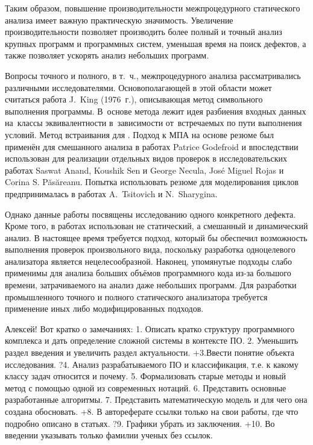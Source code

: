 
Таким образом, повышение производительности межпроцедурного статического анализа имеет важную практическую значимость. Увеличение производительности позволяет производить более полный и точный анализ крупных программ и программных систем, уменьшая время на поиск дефектов, а также позволяет ускорять анализ небольших программ.

Вопросы точного и полного, в т.~ч., межпроцедурного анализа рассматривались различными исследователями. Основополагающей в этой области может считаться работа J.~King (1976~г.), описывающая метод символьного выполнения программы. В~основе метода лежит идея разбиения входных данных на~классы эквивалентности в~зависимости от~встречаемых по пути выполнения условий. Метод встраивания для  . Подход к МПА на основе резюме был применён для смешанного анализа в работах Patrice Godefroid и впоследствии использован для реализации отдельных видов проверок в исследовательских работах Saswat Anand, Koushik Sen и George Necula, Jos\'{e} Miguel Rojas и Corina S. P\u{a}s\u{a}reanu. Попытка использовать резюме для моделирования циклов предпринималась в работах A.~Tsitovich и N.~Sharygina.

Однако данные работы посвящены исследованию одного конкретного дефекта. Кроме того, в работах использован не статический, а смешанный и динамический анализ. В настоящее время требуется подход, который бы обеспечил возможность выполнения проверок произвольного вида, поскольку разработка одноцелевого анализатора является нецелесообразной. Наконец, упомянутые подходы слабо применимы для анализа больших объёмов программного кода из-за большого времени, затрачиваемого на анализ даже небольших программ. Для разработки промышленного точного и полного статического анализатора требуется применение иных либо модифицированных подходов.



 Алексей!
Вот кратко о замечаниях:
1. Описать кратко структуру программного  комплекса и дать определение сложной системы в контексте ПО.
2. Уменьшить раздел введения и увеличить раздел актуальности. 
+3.Ввести понятие объекта исследования.
?4. Анализ разрабатываемого ПО и классификация, т.е. к какому классу задач относится и почему.
5. Формализовать старые методы и новый метод с помощью одной из современных нотаций.
6. Представить основные разработанные алгоритмы.
7. Представить математическую модель и для чего она создана обосновать.
+8. В автореферате ссылки только на свои работы, где что подробно описано в статьях.
?9. Графики убрать из заключения.
+10. Во введении указывать только фамилии ученых без ссылок.

